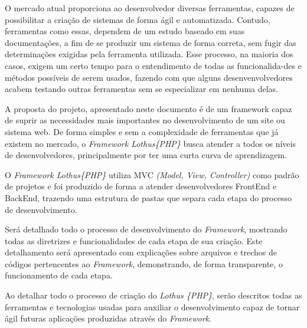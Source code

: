 \documentclass[brazil,ruledheader]{abntifes}
\begin{document}
\begin{resumo}
    O mercado atual proporciona ao desenvolvedor diversas ferramentas, capazes de possibilitar a criação de sistemas de forma ágil e automatizada. Contudo, ferramentas como essas, dependem de um estudo baseado em suas documentações, a fim de se produzir um sistema de forma correta, sem fugir das determinações exigidas pela ferramenta utilizada. Esse processo, na maioria dos casos, exigem um certo tempo para o entendimento de todas as funcionalida-des e métodos possíveis de serem usados, fazendo com que alguns desenvenvolvedores acabem testando outras ferramentas sem se especializar em nenhuma delas.

    A proposta do projeto, apresentado neste documento é de um framework capaz de suprir as necessidades mais importantes no desenvolvimento de um site ou sistema web. De forma simples e sem a complexidade de ferramentas que já existem no mercado, o \emph{Framework Lothus\{PHP\}} busca atender a todos os níveis de desenvolvedores, principalmente por ter uma curta curva de aprendizagem.

    O \emph{Framework Lothus\{PHP\}} utiliza MVC \emph{(Model, View, Controller)} como padrão de projetos e foi produzido de forma a atender desenvolvedores FrontEnd e BackEnd, trazendo uma estrutura de pastas que separa cada etapa do processo de desenvolvimento.

    Será detalhado todo o processo de desenvolvimento do \emph{Framework}, mostrando todas as diretrizes e funcionalidades de cada etapa de sua criação. Este detalhamento será apresentado com explicações sobre arquivos e trechos de códigos pertencentes ao \emph{Framework}, demonstrando, de forma transparente, o funcionamento de cada etapa.

    Ao detalhar todo o processo de criação do \emph{Lothus \{PHP\}}, serão descritos todas as ferramentas e tecnologias usadas para auxiliar o desenvolvimento capaz de tornar ágil futuras aplicações produzidas através do \emph{Framework}.

\end{resumo}


\end{document}
